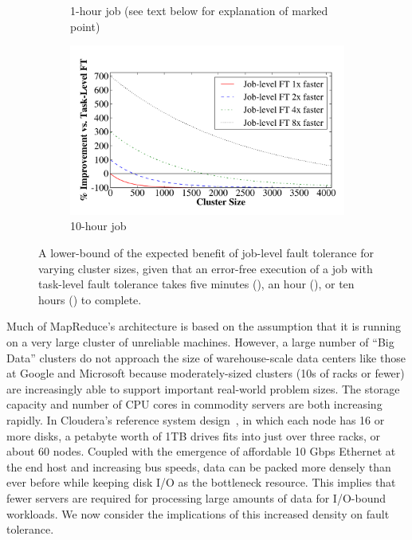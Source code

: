 \begin{figure}[t]
\begin{subfigure}[t]{0.47\textwidth}
\caption{\label{fig:ft_motivation60} 1-hour job (see text below for explanation of marked point)}
\end{subfigure}
\begin{subfigure}[t]{0.47\textwidth}
\centering
\includegraphics[width=\textwidth]{themis/graphs/analytical_failure_motivation/factor_600min}
\caption{\label{fig:ft_motivation600}10-hour job}
\end{subfigure}
\caption{\label{fig:ft_motivation} A lower-bound of the expected benefit of
  job-level fault tolerance for varying cluster sizes, given
  that an error-free execution of a job with task-level fault tolerance takes
  five minutes (), an hour (),
  or ten hours () to complete.}
\end{figure}

Much of MapReduce's architecture is based on the assumption that it is running
on a very large cluster of unreliable machines.  However, a large number of
``Big Data'' clusters do not approach the size of warehouse-scale data centers
like those at Google and Microsoft because moderately-sized clusters (10s of
racks or fewer) are increasingly able to support important real-world problem
sizes.  The storage capacity and number of CPU cores in commodity servers are
both increasing rapidly.  In Cloudera's reference system
design~\cite{ClouderaDellHadoopPlatform}, in which each node has 16 or more
disks, a petabyte worth of 1TB drives fits into just over three racks, or about
60 nodes.  Coupled with the emergence of affordable 10 Gbps Ethernet at the end
host and increasing bus speeds, data can be packed more densely than ever
before while keeping disk I/O as the bottleneck resource.  This implies that
fewer servers are required for processing large amounts of data for I/O-bound
workloads.  We now consider the implications of this increased density on fault
tolerance.

